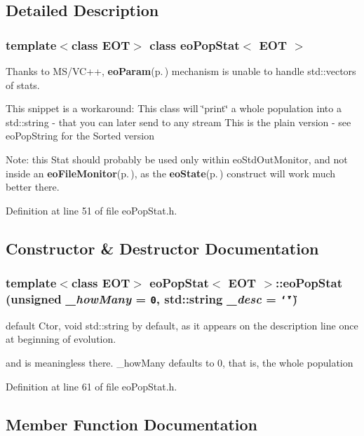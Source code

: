 \subsection{Detailed Description}
\subsubsection*{template$<$class EOT$>$ class eo\-Pop\-Stat$<$ EOT $>$}

Thanks to MS/VC++, {\bf eo\-Param}{\rm (p.\,\pageref{classeo_param})} mechanism is unable to handle std::vectors of stats. 

This snippet is a workaround: This class will \char`\"{}print\char`\"{} a whole population into a std::string - that you can later send to any stream This is the plain version - see eo\-Pop\-String for the Sorted version

Note: this Stat should probably be used only within eo\-Std\-Out\-Monitor, and not inside an {\bf eo\-File\-Monitor}{\rm (p.\,\pageref{classeo_file_monitor})}, as the {\bf eo\-State}{\rm (p.\,\pageref{classeo_state})} construct will work much better there. 



Definition at line 51 of file eo\-Pop\-Stat.h.

\subsection{Constructor \& Destructor Documentation}
\subsubsection{\setlength{\rightskip}{0pt plus 5cm}template$<$class EOT$>$ {\bf eo\-Pop\-Stat}$<$ {\bf EOT} $>$::{\bf eo\-Pop\-Stat} (unsigned {\em \_\-how\-Many} = {\tt 0}, std::string {\em \_\-desc} = {\tt \char`\"{}\char`\"{}})\hspace{0.3cm}{\tt  [inline]}}\label{classeo_pop_stat_a0}


default Ctor, void std::string by default, as it appears on the description line once at beginning of evolution. 

and is meaningless there. \_\-how\-Many defaults to 0, that is, the whole population 

Definition at line 61 of file eo\-Pop\-Stat.h.

\subsection{Member Function Documentation}
